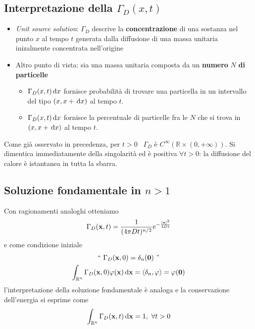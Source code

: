 \subsection{Interpretazione della \texorpdfstring{$\displaystyle \Gamma _{D}(x,t)$}{soluzione}}
\begin{itemize}
    \item \textit{Unit source solution}: $\displaystyle \Gamma _{D}$ descrive la \textbf{concentrazione} di una sostanza nel punto $x$ al tempo $t$ generata dalla diffusione di una massa unitaria inizalmente concentrata nell'origine
    \item Altro punto di vista: sia una massa unitaria composta da un \textbf{numero }$N$\textbf{ di particelle}
          \begin{itemize}
              \item $\displaystyle \Gamma _{D}(x,t) \,\mathrm d x$ fornisce probabilità di trovare una particella in un intervallo del tipo $\displaystyle (x,x+\,\mathrm d x)$ al tempo $t$.
              \item $\displaystyle \Gamma _{D}(x,t) \,\mathrm d x$ fornisce la percentuale di particelle fra le $N$ che si trova in $\displaystyle (x,x+\,\mathrm d x)$ al tempo $t$.
          \end{itemize}
\end{itemize}
\begin{nb}
    Come già osservato in precedenza, per $t >0$ \ $\displaystyle \Gamma _{D}$ è $\displaystyle C^{\infty }(\mathbb{R} \times (0,+\infty))$. Si dimentica immediatamente della singolarità ed è positiva $\displaystyle \forall t >0$: la diffusione del calore è istantanea in tutta la sbarra.
\end{nb}
\subsection{Soluzione fondamentale in \texorpdfstring{$n>1$}{n>1}}

Con ragionamenti analoghi otteniamo
\begin{equation*}
    \Gamma _{D}(\mathbf{x},t) =\frac{1}{(4\pi Dt)^{n/2}} e^{-\frac{| \mathbf{x}| ^{2}}{4Dt}}
\end{equation*}
e come condizione iniziale
\begin{gather*}
    ``\ \Gamma _{D}(\mathbf{x},0) =\delta _{n}(\mathbf{0}) \ "\\
    \int _{\mathbb{R}^{n}} \Gamma _{D}(\mathbf{x},0) \varphi (\mathbf{x}) \,\mathrm d \mathbf{x} =\langle \delta _{n},\varphi \rangle =\varphi (\mathbf{0})
\end{gather*}
l'interpretazione della soluzione fondamentale è analoga e la conservazione dell'energia si esprime come
\begin{equation*}
    \int _{\mathbb{R}^{n}} \Gamma _{D}(\mathbf{x},t) \,\mathrm d \mathbf{x} =1,\ \forall t >0
\end{equation*}
